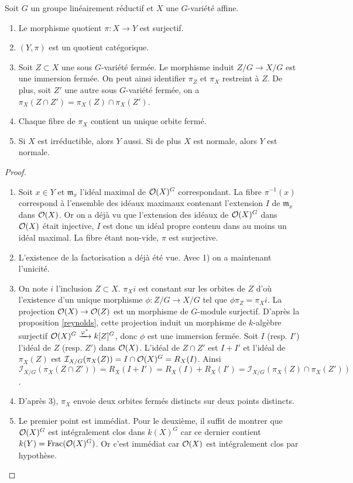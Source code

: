 \begin{thm}\label{goodquotientthm}
Soit $G$ un groupe linéairement réductif et $X$ une $G$-variété affine.
\begin{enumerate}
\item Le morphisme quotient $\pi:X\rightarrow Y$ est surjectif.
\item $(Y, \pi)$ est un quotient catégorique.
\item Soit $Z\subset X$ une sous $G$-variété fermée. Le morphisme induit $Z/G \rightarrow X/G$ est une immersion fermée. On peut ainsi identifier $\pi_Z$ et $\pi_X$ restreint à $Z$. De plus, soit $Z'$ une autre sous $G$-variété fermée, on a $\pi_X(Z\cap Z')=\pi_X(Z)\cap\pi_X(Z')$.
\item Chaque fibre de $\pi_X$ contient un unique orbite fermé.
\item Si $X$ est irréductible, alors $Y$ aussi. Si de plus $X$ est normale, alors $Y$ est normale.
\end{enumerate}
\end{thm}
\begin{proof}
\begin{enumerate}
\item Soit $x\in Y$ et $\mathfrak{m}_x$ l'idéal maximal de $\mathcal{O}(X)^G$ correspondant. La fibre $\pi^{-1}(x)$ correspond à l'ensemble des idéaux maximaux contenant l'extension $I$ de $\mathfrak{m}_x$ dans $\mathcal{O}(X)$. Or on a déjà vu que l'extension des idéaux de $\mathcal{O}(X)^G$ dans $\mathcal{O}(X)$ était injective, $I$ est donc un idéal propre contenu dans au moins un idéal maximal. La fibre étant non-vide, $\pi$ est surjective.
\item L'existence de la factorisation a déjà été vue. Avec 1) on a maintenant l'unicité.
\item On note $i$ l'inclusion $Z\subset X$. $\pi_Xi$ est constant sur les orbites de $Z$ d'où l'existence d'un unique morphisme $\phi:Z/G\rightarrow X/G$ tel que $\phi\pi_Z=\pi_Xi$. La projection $\mathcal{O}(X) \rightarrow \mathcal{O}(Z)$ est un morphisme de $G$-module surjectif. D'après la proposition \ref{reynolds}, cette projection induit un morphisme de $k$-algèbre surjectif $\mathcal{O}(X)^G \xrightarrow{\varphi^*} k[Z]^G$, donc $\phi$ est une immersion fermée.
Soit $I$ (resp. $I'$) l'idéal de $Z$ (resp. $Z'$) dans $\mathcal{O}(X)$. L'idéal de $Z\cap Z'$ est $I+I'$ et l'idéal de $\pi_X(Z)$ est $\mathcal{I}_{X/G}(\pi_X(Z))=I\cap \mathcal{O}(X)^G=R_X(I)$. Ainsi $\mathcal{I}_{X/G}(\pi_X(Z\cap Z'))=R_X(I+I')=R_X(I)+R_X(I')=\mathcal{I}_{X/G}(\pi_X(Z)\cap \pi_X(Z'))$.
\item D'après 3), $\pi_X$ envoie deux orbites fermés distincts sur deux points distincts.
\item Le premier point est immédiat. Pour le deuxième, il suffit de montrer que $\mathcal{O}(X)^G$ est intégralement clos dans $k(X)^G$ car ce dernier contient $k(Y)=\operatorname{Frac}(\mathcal{O}(X)^G)$. Or c'est immédiat car $\mathcal{O}(X)$ est intégralement clos par hypothèse.
\end{enumerate}
\end{proof}


